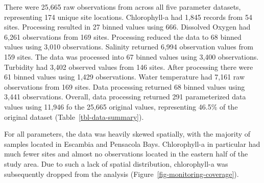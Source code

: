 \documentclass[
  review]{elsarticle}
\begin{document}
There were 25,665 raw observations from across all five parameter
datasets, representing 174 unique site locations. Chlorophyll-a had
1,845 records from 54 sites. Processing resulted in 27 binned values
using 666. Dissolved Oxygen had 6,261 observations from 169 sites.
Processing reduced the data to 68 binned values using 3,010
observations. Salinity returned 6,994 observation values from 159 sites.
The data was processed into 67 binned values using 3,400 observations.
Turbidity had 3,402 observed values from 146 sites. After processing
there were 61 binned values using 1,429 observations. Water temperature
had 7,161 raw observations from 169 sites. Data processing returned 68
binned values using 3,441 observations. Overall, data processing
returned 291 parameterized data values using 11,946 fo the 25,665
original values, representing 46.5\% of the original dataset
(Table~\ref{tbl-data-summary}).

For all parameters, the data was heavily skewed spatially, with the
majority of samples located in Escambia and Pensacola Bays.
Chlorophyll-a in particular had much fewer sites and almost no
observations located in the eastern half of the study area. Due to such
a lack of spatial distribution, chlorophyll-a was subsequently dropped
from the analysis (Figure~\ref{fig-monitoring-coverage}).
\end{document}
